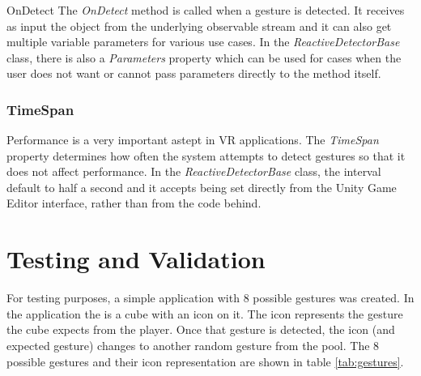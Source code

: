 \documentclass[12pt,a4paper,twoside]{report}
\begin{document}
\subsection{}{OnDetect}
The \textit{OnDetect} method is called when a gesture is detected. It receives as input the object from the underlying observable stream and it can also get multiple variable parameters for various use cases. In the \textit{ReactiveDetectorBase} class, there is also a \textit{Parameters} property which can be used for cases when the user does not want or cannot pass parameters directly to the method itself.

\subsection{TimeSpan}
Performance is a very important astept in VR applications. The \textit{TimeSpan} property determines how often the system attempts to detect gestures so that it does not affect performance. In the \textit{ReactiveDetectorBase} class, the interval default to half a second and it accepts being set directly from the Unity Game Editor interface, rather than from the code behind.

\chapter{Testing and Validation}

For testing purposes, a simple application with 8 possible gestures was created. In the application the is a cube with an icon on it. The icon represents the gesture the cube expects from the player. Once that gesture is detected, the icon (and expected gesture) changes to another random gesture from the pool. The 8 possible gestures and their icon representation are shown in table \ref{tab:gestures}.
\end{document}
